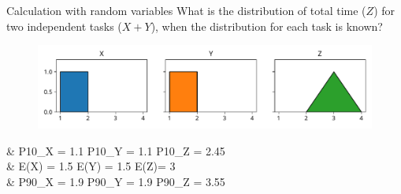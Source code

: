 \documentclass[12pt, aspectratio=149]{beamer}
\theoremstyle{plain}
\begin{document}
\begin{frame}[fragile]{Calculation with random variables}
	What is the distribution of total time ($Z$) for two independent tasks ($X + Y$), when the distribution for each task is known?
    \begin{center}
     \begin{figure}
     	\centering
     	\includegraphics[width=0.99\linewidth]{figures/add_uniform}
     \end{figure}
     \end{center}
	 \begin{flalign*}
     	&\hspace*{1em} P10_X = 1.1 \hspace*{4em} P10_Y = 1.1 \hspace*{4em}  P10_Z = 2.45 \\
	 	&\hspace*{1em} E(X) = 1.5  \hspace*{4.2em} E(Y) = 1.5  \hspace*{4.3em}  E(Z)= 3 \\
     	&\hspace*{1em} P90_X = 1.9 \hspace*{4em} P90_Y = 1.9 \hspace*{4em}  P90_Z = 3.55 \\
	\end{flalign*}
\end{frame}
\end{document}
